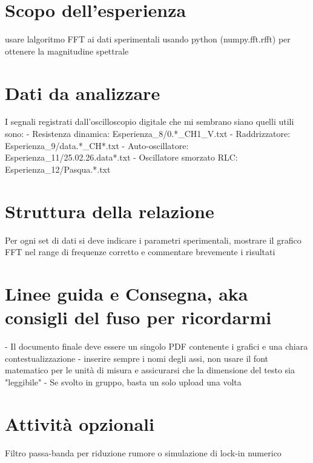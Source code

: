 \section{Scopo dell'esperienza}
usare lalgoritmo FFT ai dati sperimentali usando python (numpy.fft.rfft) per ottenere la magnitudine spettrale

\section{Dati da analizzare}
I segnali registrati dall'oscilloscopio digitale che mi sembrano siano quelli utili sono:
- Resistenza dinamica: Esperienza\_8/0.*\_CH1\_V.txt
- Raddrizzatore: Esperienza\_9/data.*\_CH*.txt
- Auto-oscillatore: Esperienza\_11/25.02.26.data*.txt
- Oscillatore smorzato RLC: Esperienza\_12/Pasqua.*.txt

\section{Struttura della relazione}
Per ogni set di dati si deve indicare i parametri sperimentali, mostrare il grafico FFT nel range di frequenze corretto e commentare brevemente i risultati

\section{Linee guida e Consegna, aka consigli del fuso per ricordarmi}
- Il documento finale deve essere un singolo PDF contenente i grafici e una chiara contestualizzazione
- inserire sempre i nomi degli assi, non usare il font matematico per le unità di misura e assicurarsi che la dimensione del testo sia "leggibile"
- Se svolto in gruppo, basta un solo upload una volta 

\section{Attività opzionali}
Filtro passa-banda per riduzione rumore o simulazione di lock-in numerico
